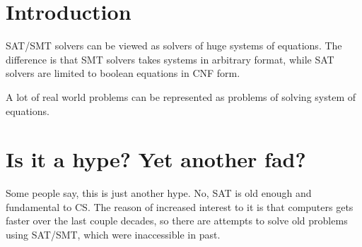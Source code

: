 \section{Introduction}

\ac{SAT}/\ac{SMT} solvers can be viewed as solvers of huge systems of equations.
The difference is that \ac{SMT} solvers takes systems in arbitrary format,
while \ac{SAT} solvers are limited to boolean equations in \ac{CNF} form.

A lot of real world problems can be represented as problems of solving system of equations.

\section{Is it a hype? Yet another fad?}

Some people say, this is just another hype.
No, \ac{SAT} is old enough and fundamental to \ac{CS}.
The reason of increased interest to it is that computers gets faster over the last couple decades,
so there are attempts to solve old problems using \ac{SAT}/\ac{SMT}, which were inaccessible in past.

